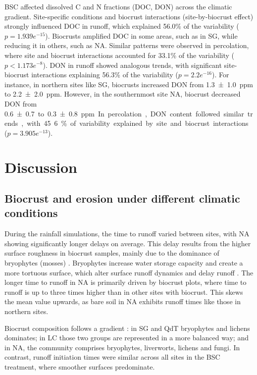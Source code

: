 BSC affected dissolved C and N fractions (DOC, DON) across the climatic gradient. Site-specific conditions and biocrust interactions (site-by-biocrust effect) strongly influenced DOC in runoff, which explained 56.0\% of the variability ($p = 1.939e^{-15}$). Biocrusts amplified DOC in some areas, such as in SG, while reducing it in others, such as NA. Similar patterns were observed in percolation, where site and biocrust interactions accounted for 33.1\% of the variability ($p < 1.173e^{-8}$). DON in runoff showed analogous trends, with significant site-biocrust interactions explaining 56.3\% of the variability ($p = 2.2e^{-16}$). For instance, in northern sites like SG, biocrusts increased DON from \SI[separate-uncertainty,multi-part-units=single]{1.3 \pm 1.0}{ppm} to \SI[separate-uncertainty,multi-part-units=single]{2.2 \pm 2.0}{ppm}. However, in the southernmost site NA, biocrust decreased DON from \SI[separate-uncertainty,multi-part-units=single]{0.6 \pm 0.7} to \SI[separate-uncertainty,multi-part-units=single]{0.3 \pm 0.8}{ppm}. In percolation, DON content followed similar trends, with 45.6\% of variability explained by site and biocrust interactions ($p = 3.905e^{-13}$).

\section{Discussion}
\subsection{Biocrust and erosion under different climatic conditions}

During the rainfall simulations, the time to runoff varied between sites, with NA showing significantly longer delays on average. This delay results from the higher surface roughness in biocrust samples, mainly due to the dominance of bryophytes (mosses) \citep{RiverasMunoz2022}. Bryophytes increase water storage capacity and create a more tortuous surface, which alter surface runoff dynamics and delay runoff \citep{Chamizo2016,Juan2023,Zeng2025}. The longer time to runoff in NA is primarily driven by biocrust plots, where time to runoff is up to three times higher than in other sites with biocrust. This skews the mean value upwards, as bare soil in NA exhibits runoff times like those in northern sites.

Biocrust composition follows a gradient \citep{RiverasMunoz2022}: in SG and QdT bryophytes and lichens dominates; in LC those two groups are represented in a more balanced way; and in NA, the community comprises bryophytes, liverworts, lichens and fungi. In contrast, runoff initiation times were similar across all sites in the BSC treatment, where smoother surfaces predominate.

